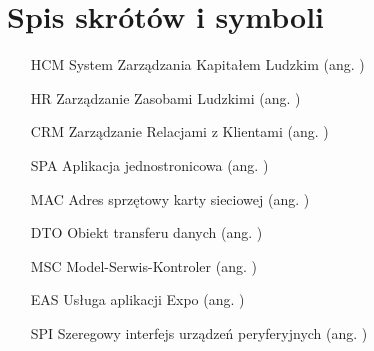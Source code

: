 \chapter{Spis skrótów i symboli}

\begin{itemize}
    \item[HCM] System Zarządzania Kapitałem Ludzkim (ang. )
    \item[HR] Zarządzanie Zasobami Ludzkimi (ang. )
    \item[CRM] Zarządzanie Relacjami z Klientami (ang. )
    \item[SPA] Aplikacja jednostronicowa (ang. )
    \item[MAC] Adres sprzętowy karty sieciowej (ang. )
    \item[DTO] Obiekt transferu danych (ang. )
    \item[MSC] Model-Serwis-Kontroler (ang. )
    \item[EAS] Usługa aplikacji Expo (ang. )
    \item[SPI] Szeregowy interfejs urządzeń peryferyjnych (ang. )
\end{itemize}
